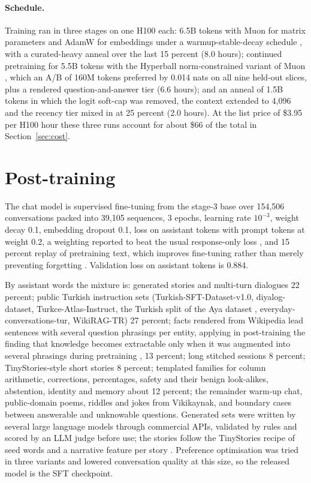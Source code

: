 \documentclass[11pt]{article}
\begin{document}
\paragraph{Schedule.} Training ran in three stages on one H100 each: 6.5B tokens with Muon \cite{muon} for matrix parameters and AdamW for embeddings under a warmup-stable-decay schedule \cite{minicpm}, with a curated-heavy anneal over the last 15 percent (8.0 hours); continued pretraining for 5.5B tokens with the Hyperball norm-constrained variant of Muon \cite{hyperball}, which an A/B of 160M tokens preferred by 0.014 nats on all nine held-out slices, plus a rendered question-and-answer tier (6.6 hours); and an anneal of 1.5B tokens in which the logit soft-cap was removed, the context extended to 4,096 and the recency tier mixed in at 25 percent (2.0 hours). At the list price of \$3.95 per H100 hour these three runs account for about \$66 of the total in Section~\ref{sec:cost}.

\section{Post-training}\label{sec:post}
The chat model is supervised fine-tuning from the stage-3 base over 154,506 conversations packed into 39,105 sequences, 3 epochs, learning rate $10^{-3}$, weight decay 0.1, embedding dropout 0.1, loss on assistant tokens with prompt tokens at weight 0.2, a weighting reported to beat the usual response-only loss \cite{wit}, and 15 percent replay of pretraining text, which improves fine-tuning rather than merely preventing forgetting \cite{replay}. Validation loss on assistant tokens is 0.884.

By assistant words the mixture is: generated stories and multi-turn dialogues 22 percent; public Turkish instruction sets (Turkish-SFT-Dataset-v1.0, diyalog-dataset, Turkce-Atlas-Instruct, the Turkish split of the Aya dataset \cite{aya}, everyday-conversations-tur, WikiRAG-TR) 27 percent; facts rendered from Wikipedia lead sentences with several question phrasings per entity, applying in post-training the finding that knowledge becomes extractable only when it was augmented into several phrasings during pretraining \cite{physics31}, 13 percent; long stitched sessions 8 percent; TinyStories-style short stories 8 percent; templated families for column arithmetic, corrections, percentages, safety and their benign look-alikes, abstention, identity and memory about 12 percent; the remainder warm-up chat, public-domain poems, riddles and jokes from Vikikaynak, and boundary cases between answerable and unknowable questions. Generated sets were written by several large language models through commercial APIs, validated by rules and scored by an LLM judge before use; the stories follow the TinyStories recipe of seed words and a narrative feature per story \cite{tinystories}. Preference optimisation \cite{dpo} was tried in three variants and lowered conversation quality at this size, so the released model is the SFT checkpoint.
\end{document}
